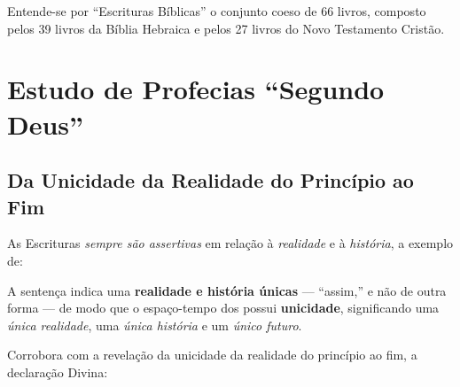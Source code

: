     Entende-se por ``Escrituras Bíblicas'' o conjunto coeso de 66 livros, composto pelos 39 livros da Bíblia Hebraica e pelos 27
    livros do Novo Testamento Cristão.


\section{Estudo de Profecias ``Segundo Deus''}

    \subsection{Da Unicidade da Realidade do Princípio ao Fim}

    As Escrituras \emph{sempre são assertivas} em relação à \emph{realidade} e à \emph{história}, a exemplo de:


    A sentença  indica uma \textbf{realidade e história únicas} --- ``assim,'' e não de outra forma ---  de
    modo que o espaço-tempo dos  possui \textbf{unicidade}, significando uma  \emph{única  realidade},  uma
    \emph{única história} e um \emph{único futuro}.

    Corrobora com a revelação da unicidade da realidade do princípio ao fim, a declaração Divina:
        

